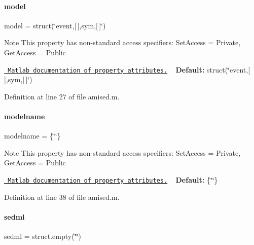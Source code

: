 \paragraph{\texorpdfstring{model}{model}}
{\footnotesize\ttfamily model = struct(\char`\"{}\textquotesingle{}event\textquotesingle{},\mbox{[}$\,$\mbox{]},\textquotesingle{}sym\textquotesingle{},\mbox{[}$\,$\mbox{]}\char`\"{})}

\begin{DoxyNote}{Note}
This property has non-\/standard access specifiers\+: {\ttfamily Set\+Access = Private, Get\+Access = Public} 

\href{http://www.mathworks.com/help/matlab/matlab_oop/property-attributes.html}{\texttt{ Matlab documentation of property attributes.}} ~\newline
{\bfseries{Default\+:}} struct(\char`\"{}\textquotesingle{}event\textquotesingle{},\mbox{[}$\,$\mbox{]},\textquotesingle{}sym\textquotesingle{},\mbox{[}$\,$\mbox{]}\char`\"{}) 
\end{DoxyNote}


Definition at line 27 of file amised.\+m.

\mbox{\label{classamised_a71bca9c21a6de42d8079ade31cb61044}} 
\paragraph{\texorpdfstring{modelname}{modelname}}
{\footnotesize\ttfamily modelname = \{\char`\"{}\char`\"{}\}}

\begin{DoxyNote}{Note}
This property has non-\/standard access specifiers\+: {\ttfamily Set\+Access = Private, Get\+Access = Public} 

\href{http://www.mathworks.com/help/matlab/matlab_oop/property-attributes.html}{\texttt{ Matlab documentation of property attributes.}} ~\newline
{\bfseries{Default\+:}} \{\char`\"{}\char`\"{}\} 
\end{DoxyNote}


Definition at line 38 of file amised.\+m.

\mbox{\label{classamised_a85ed334cf4c17568e28b725e3b755135}} 
\paragraph{\texorpdfstring{sedml}{sedml}}
{\footnotesize\ttfamily sedml = struct.\+empty(\char`\"{}\char`\"{})}

